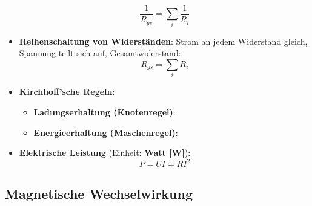 \begin{itemize}
	\begin{equation}
		\frac{1}{R_{gs}} = \sum_i \frac{1}{R_i}
	\end{equation}
	\item \textbf{Reihenschaltung von Widerständen}: Strom an jedem Widerstand gleich, Spannung teilt sich auf, Gesamtwiderstand:
	\begin{equation}
		R_{gs} = \sum_i R_i
	\end{equation}
	\item \textbf{Kirchhoff'sche Regeln}:
	\begin{itemize}
		\item \textbf{Ladungserhaltung (Knotenregel)}: 
		\item \textbf{Energieerhaltung (Maschenregel)}: 
	\end{itemize}
	\item \textbf{Elektrische Leistung} (Einheit: \textbf{Watt [W]}):
	\begin{equation}
		P = U I = R I^2
	\end{equation}
\end{itemize}

\newpage
\subsection{Magnetische Wechselwirkung}%
\label{edyn:sub:magnetische_wechselwirkung}

